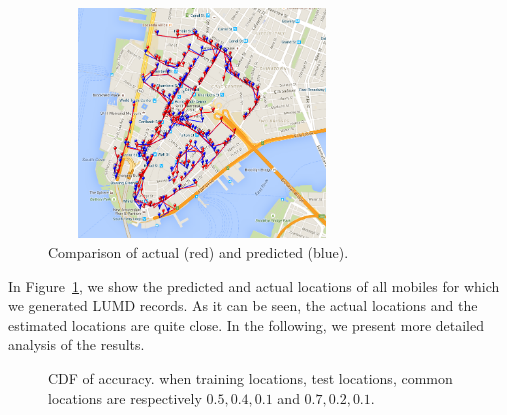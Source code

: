 \documentclass[conference, 10pt]{IEEEtran}
\begin{document}
\begin{figure}[t]
\begin{center}
\includegraphics[height=2.4in,width=3.2in]{./path-gmaps.png}
\caption{\label{fig:toyeg}
{\small Comparison of actual (red) and predicted (blue).}}
\end{center}
\end{figure}


In Figure~\ref{fig:toyeg}, we show the predicted and actual locations of all mobiles
for which we generated LUMD records. As it can be seen, the actual locations
and the estimated locations are quite close. In the following, we present more
detailed analysis of the results.

\begin{figure}[t]
\begin{center}
\caption{CDF of accuracy.\label{fig:leapperf} when training locations, test
locations, common locations are respectively $0.5,0.4,0.1$ and $0.7,0.2,0.1$.}
\end{center}
\end{figure}
\end{document}
